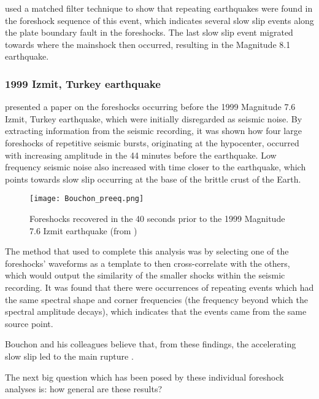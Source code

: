 \documentclass[12pt]{report}
\begin{document}
\cite{Kato2014} used a matched filter technique to show that repeating earthquakes were found in the foreshock sequence of this event, which indicates several slow slip events along the plate boundary fault in the foreshocks. The last slow slip event migrated towards where the mainshock then occurred, resulting in the Magnitude 8.1 earthquake. 


\subsubsection{1999 Izmit, Turkey earthquake}
\cite{Bouchon2011} presented a paper on the foreshocks occurring before the 1999 Magnitude 7.6 Izmit, Turkey earthquake, which were initially disregarded as seismic noise. By extracting information from the seismic recording, it was shown how four large foreshocks of repetitive seismic bursts, originating at the hypocenter, occurred with increasing amplitude in the 44 minutes before the earthquake. Low frequency seismic noise also increased with time closer to the earthquake, which points towards slow slip occurring at the base of the brittle crust of the Earth. 

\begin{figure}[h]
	\begin{center}
		\texttt{[image: Bouchon\_preeq.png]}
		\caption{Foreshocks recovered in the 40 seconds prior to the 1999 Magnitude 7.6 Izmit earthquake (from \cite{Bouchon2011, Kerr2011})}
		\label{Bouchon_preeq}
	\end{center}
\end{figure}

The method that \cite{Bouchon2011} used to complete this analysis was by selecting one of the foreshocks' waveforms as a template to then cross-correlate with the others, which would output the similarity of the smaller shocks within the seismic recording. It was found that there were occurrences of repeating events which had the same spectral shape and corner frequencies (the frequency beyond which the spectral amplitude decays), which indicates that the events came from the same source point. 

Bouchon and his colleagues believe that, from these findings, the accelerating slow slip led to the main rupture \citep{Bouchon2011,Kerr2011}. 

The next big question which has been posed by these individual foreshock analyses is: how general are these results? 

\end{document}
